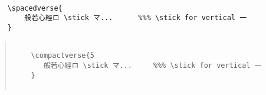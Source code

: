 \documentclass[letterpaper]{article}
\begin{document}
\begin{verbatim}

	\spacedverse{
		般若心經ロ \stick マ...      %%% \stick for vertical 一
	}

\end{verbatim}

\pagebreak

\vspace*{2cm}

\renewcommand{\kanji}{\centering\fontsize{25}{25}}
\begin{multicols}{7}
	\RLmulticolcolumns
\end{multicols}

\vspace*{1cm}

\begin{quotation}
	
	\begin{verbatim}
	
	\compactverse{5
	   般若心經ロ \stick マ...     %%% \stick for vertical 一
	}
	
	\end{verbatim}
	
\end{quotation}
\end{document}
